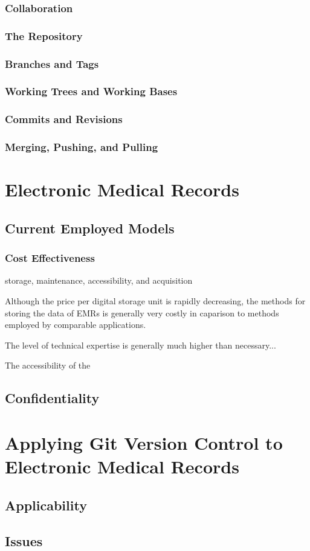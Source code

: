 \documentclass{acm_proc_article-sp}
\begin{document}
\subsubsection{Collaboration}
\subsubsection{The Repository}
\subsubsection{Branches and Tags}
\subsubsection{Working Trees and Working Bases}
\subsubsection{Commits and Revisions}
\subsubsection{Merging, Pushing, and Pulling}

\section{Electronic Medical Records}
\subsection{Current Employed Models}
\subsubsection{Cost Effectiveness}

storage, maintenance, accessibility, and acquisition

Although the price per digital storage unit is rapidly decreasing, the methods for storing 
the data of EMRs is generally very costly in caparison to methods employed by comparable 
applications.  

The level of technical expertise is generally much higher than necessary...

The accessibility of the 

\subsection{Confidentiality}

\section{Applying Git Version Control to Electronic Medical Records}

\subsection{Applicability}
\subsection{Issues}
\end{document}
